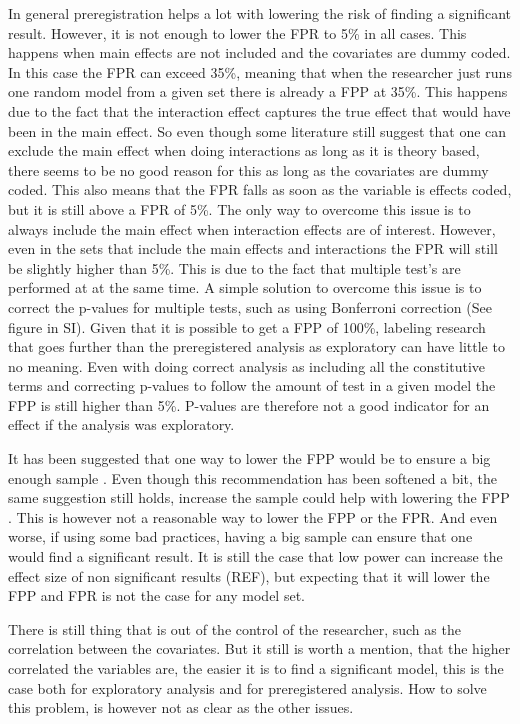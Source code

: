 In general preregistration helps a lot with lowering the risk of finding a significant result. However, it is not enough to lower the FPR to 5\%  in all cases. This happens when main effects are not included and the covariates are dummy coded. In this case the FPR can exceed 35\%, meaning that when the researcher just runs one random model from a given set there is already a FPP at 35\%. This happens due to the fact that the interaction effect captures the true effect that would have been in the main effect. So even though some literature still suggest that one can exclude the main effect when doing interactions as long as it is theory based, there seems to be no good reason for this as long as the covariates are dummy coded. This also means that the FPR falls as soon as the variable is effects coded, but it is still above a FPR of 5\%. The only way to overcome this issue is to always include the main effect when interaction effects are of interest. However, even in the sets that include the main effects and interactions the FPR will still be slightly higher than 5\%. This is due to the fact that multiple test's are performed at at the same time. A simple solution to overcome this issue is to correct the p-values for multiple tests, such as using Bonferroni correction \citep{dunn1961multiple} (See figure in SI).  
Given that it is possible to get a FPP of 100\%, labeling research that goes further than the preregistered analysis as exploratory can have little to no meaning. Even with doing correct analysis as including all the constitutive terms and correcting p-values to follow the amount of test in a given model the FPP is still higher than 5\%. P-values are therefore not a good indicator for an effect if the analysis was exploratory. 
    
It has been suggested that one way to lower the FPP would be to ensure a big enough sample \citep{Simmons2011}. Even though this recommendation has been softened a bit, the same suggestion still holds, increase the sample could help with lowering the FPP \cite{simmons2018}. This is however not a reasonable way to lower the FPP or the FPR. And even worse, if using some bad practices, having a big sample can ensure that one would find a significant result. It is still the case that low power can increase the effect size of non significant results (REF), but expecting that it will lower the FPP and FPR is not the case for any model set. 

There is still thing that is out of the control of the researcher, such as the correlation between the covariates. But it still is worth a mention, that the higher correlated the variables are, the easier it is to find a significant model, this is the case both for exploratory analysis and for preregistered analysis. How to solve this problem, is however not as clear as the other issues. 

